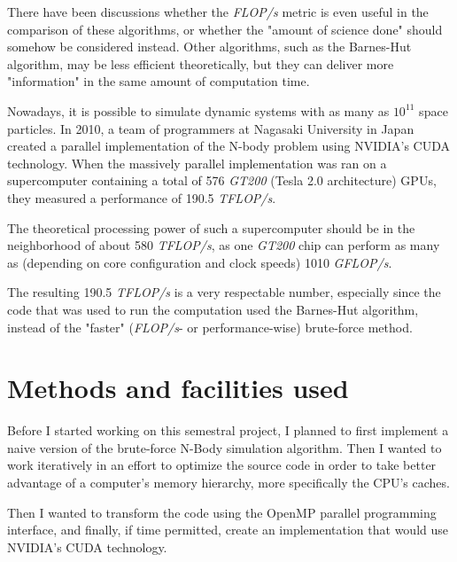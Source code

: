 \documentclass[journal]{IEEEtran}
\begin{document}
		There have been discussions whether the \textit{FLOP/s} metric is even useful in the comparison of these algorithms, or whether the "amount of science done" should somehow be considered instead. Other algorithms, such as the Barnes-Hut algorithm, may be less efficient theoretically, but they can deliver more "information" in the same amount of computation time.
		
		Nowadays, it is possible to simulate dynamic systems with as many as $10^{11}$ space particles. In 2010, a team of programmers at Nagasaki University in Japan created a parallel implementation of the N-body problem using NVIDIA’s CUDA technology. When the massively parallel implementation was ran on a supercomputer containing a total of 576 \textit{GT200} (Tesla 2.0 architecture) GPUs, they measured a performance of 190.5 \textit{TFLOP/s}. \cite{teraflops}
		
		The theoretical processing power of such a supercomputer should be in the neighborhood of about 580 \textit{TFLOP/s}, as one \textit{GT200} chip can perform as many as (depending on core configuration and clock speeds) 1010 \textit{GFLOP/s}.\cite{wikitesla}
		
		The resulting 190.5 \textit{TFLOP/s} is a very respectable number, especially since the code that was used to run the computation used the Barnes-Hut algorithm, instead of the "faster" (\textit{FLOP/s}- or performance-wise) brute-force method.
		
	\section{Methods and facilities used}
	
		Before I started working on this semestral project, I planned to first implement a naive version of the brute-force N-Body simulation algorithm. Then I wanted to work iteratively in an effort to optimize the source code in order to take better advantage of a computer's memory hierarchy, more specifically the CPU's caches. 
		
		Then I wanted to transform the code using the OpenMP parallel programming interface, and finally, if time permitted, create an implementation that would use NVIDIA's CUDA technology.
		
\end{document}

